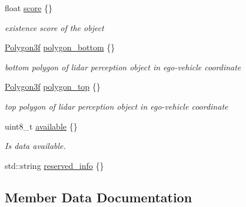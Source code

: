 \begin{DoxyCompactItemize}
float \hyperlink{structmaf__perception__interface_1_1LidarPerceptionObjectData_a020003b46cab727716be5b38d1d621ba}{score} \{\}
\begin{DoxyCompactList}\small\item\em existence score of the object \end{DoxyCompactList}\item 
\hyperlink{structmaf__perception__interface_1_1Polygon3f}{Polygon3f} \hyperlink{structmaf__perception__interface_1_1LidarPerceptionObjectData_a7cd684310b3e3ce43267f3318eb72b36}{polygon\+\_\+bottom} \{\}
\begin{DoxyCompactList}\small\item\em bottom polygon of lidar perception object in ego-\/vehicle coordinate \end{DoxyCompactList}\item 
\hyperlink{structmaf__perception__interface_1_1Polygon3f}{Polygon3f} \hyperlink{structmaf__perception__interface_1_1LidarPerceptionObjectData_a7e0c16b1a2c2a2c0edf687416a36d3f2}{polygon\+\_\+top} \{\}
\begin{DoxyCompactList}\small\item\em top polygon of lidar perception object in ego-\/vehicle coordinate \end{DoxyCompactList}\item 
uint8\+\_\+t \hyperlink{structmaf__perception__interface_1_1LidarPerceptionObjectData_af6c062bcb9aa73bea8f7480d2b46b7dd}{available} \{\}
\begin{DoxyCompactList}\small\item\em Is data available. \end{DoxyCompactList}\item 
std\+::string \hyperlink{structmaf__perception__interface_1_1LidarPerceptionObjectData_a6180a4225aef1ac41520fd9b94b9dd6c}{reserved\+\_\+info} \{\}
\end{DoxyCompactItemize}


\subsection{Member Data Documentation}
\mbox{\label{structmaf__perception__interface_1_1LidarPerceptionObjectData_af16613f77aa0487ea7e73f1e6441757d}} 
